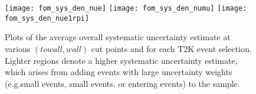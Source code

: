 \begin{figure}[h]
  \begin{center}
    \texttt{[image: fom\_sys\_den\_nue]}
    \texttt{[image: fom\_sys\_den\_numu]}
    \texttt{[image: fom\_sys\_den\_nue1rpi]}
  \end{center}
  \caption{Plots of the average overall systematic uncertainty estimate at various $(towall,wall)$
  cut points and for each T2K event selection.  Lighter regions denote a higher systematic uncertainty estimate,
  which arises from adding events with large uncertainty weights (e.g.\@ small \towall events, small \wall events, or
  entering events) to the sample.}
  \label{fig:avgsys}
\end{figure}



\FloatBarrier
